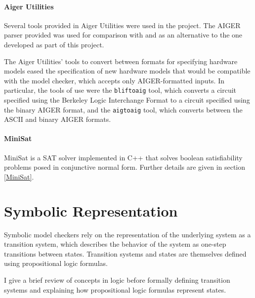 \documentclass[12pt,a4paper,twoside,openright]{report}
\begin{document}
\paragraph{Aiger Utilities}{
Several tools provided in Aiger Utilities were used in the project. The
AIGER parser provided was used for comparison with and as an alternative
to the one developed as part of this project. 

The Aiger Utilities' tools to convert between formats for specifying
hardware models eased the specification of new hardware models that would
be compatible with the model checker, which accepts only AIGER-formatted inputs.
In particular, the tools of use were
the {\tt bliftoaig}
tool, which converts a circuit specified using the Berkeley Logic Interchange Format
to a circuit specified using the binary AIGER format, and the {\tt aigtoaig} tool,
which converts between the ASCII and binary AIGER formats.
}

\paragraph{MiniSat}{
MiniSat is a SAT solver implemented in C++ that solves boolean satisfiability problems
posed in conjunctive normal form. Further details are given in section \ref{MiniSat}.
}

\section{Symbolic Representation}
\label{logic}

Symbolic model checkers rely on the representation of the underlying system as a
transition system, which describes the behavior of the system as one-step transitions
between states. Transition systems and states are themselves defined using
propositional logic formulas.

I give a brief review of concepts in logic before formally defining transition systems
and explaining how propositional logic formulas represent states.
\end{document}
